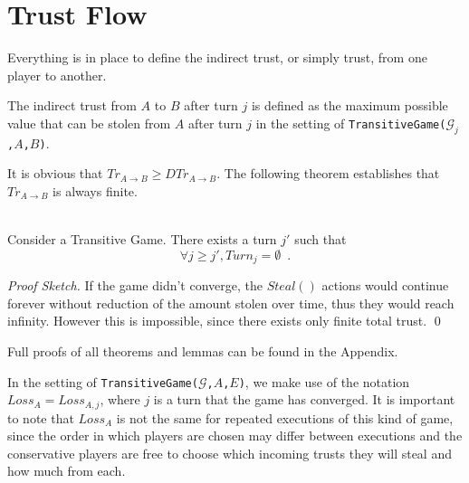 \documentclass[11pt]{llncs}
\theoremstyle{definition}
\newenvironment{proofsketch}{\textit{Proof Sketch.}}{\qed \smallskip \ \\}
\begin{document}
  \section{Trust Flow}
    Everything is in place to define the indirect trust, or simply trust, from one player to another.
    \begin{definition}
       The indirect trust from $A$ to $B$ after turn $j$ is defined as the maximum possible value that can be stolen from
       $A$ after turn $j$ in the setting of \texttt{TransitiveGame(}$\mathcal{G}_j$\texttt{,}$A$\texttt{,}$B$\texttt{)}.
    \end{definition}
    It is obvious that $Tr_{A \rightarrow B} \geq DTr_{A \rightarrow B}$. The following theorem establishes that
    $Tr_{A \rightarrow B}$ is always finite.
    \begin{theorem} \ \\
       \label{convergence}
       Consider a Transitive Game. There exists a turn $j'$ such that
       \begin{equation*}
          \forall j \geq j', Turn_j = \emptyset \enspace.
       \end{equation*}
    \end{theorem}
    \begin{proofsketch}
       If the game didn't converge, the $Steal\left(\right)$ actions would continue forever without reduction of the amount
       stolen over time, thus they would reach infinity. However this is impossible, since there exists only finite total
       trust.
    \end{proofsketch}

    Full proofs of all theorems and lemmas can be found in the Appendix.

    In the setting of \texttt{TransitiveGame(}$\mathcal{G}$\texttt{,}$A$\texttt{,}$E$\texttt{)}, we make use of the notation
    $Loss_A = Loss_{A, j}$, where $j$ is a turn that the game has converged. It is important to note that $Loss_A$ is
    not the same for repeated executions of this kind of game, since the order in which players are chosen may differ between
    executions and the conservative players are free to choose which incoming trusts they will steal and how much from each.
\end{document}
